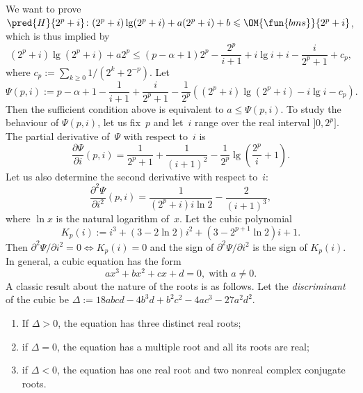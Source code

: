 We want to prove \(\pred{H}{2^p+i} \colon (2^p+i)\lg(2^p+i) +
a(2^p+i) + b \leqslant \OM{\fun{bms}}{2^p+i}\), which is thus implied
by
\begin{equation*}
(2^p+i)\lg(2^p+i) + a2^p \leqslant (p - \alpha + 1)2^p -
\frac{2^p}{i+1} + i\lg i + i - \frac{i}{2^p+1} + c_p,
\end{equation*}
where \(c_p := \sum_{k \geqslant 0}1/(2^{k}+2^{-p})\). Let
\begin{equation*}
  \Psi(p,i) := p - \alpha + 1 - \frac{1}{i+1} + \frac{i}{2^p+1} -
  \frac{1}{2^p}((2^p+i)\lg(2^p+i) - i\lg i - c_p).
\end{equation*}
Then the sufficient condition above is equivalent to \(a \leqslant
\Psi(p,i)\). To study the behaviour of \(\Psi(p,i)\), let us fix~\(p\)
and let~\(i\) range over the real interval \(]0,2^p]\). The partial
derivative of~\(\Psi\) with respect to~\(i\) is
\begin{equation*}
\frac{\partial\Psi}{\partial i}(p,i) = \frac{1}{2^p+1}
+ \frac{1}{(i+1)^2} - \frac{1}{2^p}\lg\left(\frac{2^p}{i}+1\right).
\end{equation*}
Let us also determine the second derivative with respect to~\(i\):
\begin{equation*}
\frac{\partial^2\Psi}{\partial i^2}(p,i) = \frac{1}{(2^p+i)i\ln 2} - \frac{2}{(i+1)^3},
\end{equation*}
where \(\ln x\) is the natural logarithm of~\(x\). Let the cubic
polynomial
\begin{equation*}
K_p(i) := i^3 + (3 - 2\ln 2)i^2 + (3 - 2^{p+1}\ln 2)i + 1.
\end{equation*}
Then \(\partial^2\Psi/\partial i^2 = 0 \Leftrightarrow K_p(i) = 0\)
and the sign of \(\partial^2\Psi/\partial i^2\) is the sign of
\(K_p(i)\). In general, a cubic equation has the form
\begin{equation*}
ax^3 + bx^2 + cx + d = 0, \; \text{with \(a \neq 0\)}.
\end{equation*}
A classic result about the nature of the roots is as follows. Let the
\emph{discriminant} of the cubic be \(\Delta :=
18abcd - 4b^3d + b^2c^2 - 4ac^3 - 27a^2d^2\).
\begin{enumerate}

  \item If \(\Delta > 0\), the equation has three distinct real roots;

  \item if \(\Delta = 0\), the equation has a multiple root and all
    its roots are real;

  \item if \(\Delta < 0\), the equation has one real root and two
    nonreal complex conjugate roots.

\end{enumerate}

